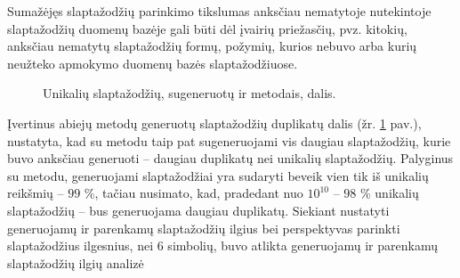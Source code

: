 \documentclass{VUMIFInfBakalaurinis}
\begin{document}
Sumažėjęs slaptažodžių parinkimo tikslumas anksčiau nematytoje 
 nutekintoje slaptažodžių duomenų bazėje gali būti dėl 
įvairių priežasčių, pvz. kitokių, anksčiau nematytų slaptažodžių formų, požymių, 
kurios nebuvo arba kurių neužteko apmokymo duomenų bazės slaptažodžiuose.

\begin{figure}[!ht]
  \begin{center}
  \end{center}
  \caption{%
    Unikalių slaptažodžių, sugeneruotų  ir  
    metodais, dalis.
  }
  \label{plot:passgan-pcfg-duplicates}
\end{figure}
Įvertinus abiejų metodų generuotų slaptažodžių duplikatų dalis (žr. 
\ref{plot:passgan-pcfg-duplicates} pav.), nustatyta, kad su  
metodu taip pat sugeneruojami vis daugiau slaptažodžių, kurie buvo anksčiau 
generuoti -- daugiau duplikatų nei unikalių slaptažodžių. Palyginus 
 su  metodu,  generuojami 
slaptažodžiai yra sudaryti beveik vien tik iš unikalių reikšmių -- $99$ \%, 
tačiau nusimato, kad, pradedant nuo $10^{10}$ -- $98$ \% unikalių slaptažodžių 
-- bus generuojama daugiau duplikatų. Siekiant nustatyti generuojamų ir 
parenkamų slaptažodžių ilgius bei perspektyvas parinkti slaptažodžius ilgesnius, 
nei 6 simbolių, buvo atlikta generuojamų ir parenkamų slaptažodžių ilgių analizė 
\end{document}
